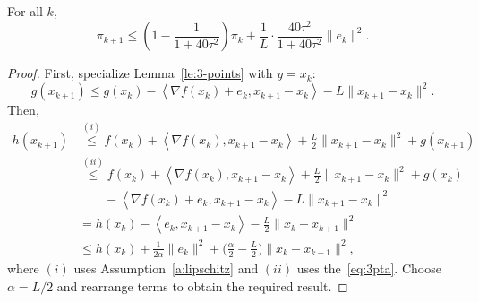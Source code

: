 \begin{lem} 
\label{lem:sufficient_decrease} For all $k$, 
\[
\pi_{k+1}\leq\left(1-\frac{1}{1+40\tau^{2}}\right)\pi_{k}
   +\frac{1}{L}\cdot\frac{40\tau^{2}}{1+40\tau^{2}}\|e_{k}\|^{2}.
\]
\end{lem}

\begin{proof} First, specialize Lemma~\ref{le:3-points} with $y=x_{k}$:
\begin{equation} \label{eq:3pta}
g(x_{k+1}) \leq g(x_{k})-\left\langle \nabla f(x_{k})
  +e_{k},x_{k+1}-x_{k}\right\rangle -L\|x_{k+1}-x_{k}\|^{2}.
\end{equation}
Then,
\begin{align*}
h(x_{k+1}) & \overset{(i)}{\leq}f(x_{k})+\left\langle \nabla f(x_{k}),x_{k+1}-x_{k}\right\rangle +\frac{L}{2}\|x_{k+1}-x_{k}\|^{2}+g(x_{k+1})\\
 & \overset{(ii)}{\leq}f(x_{k})+\left\langle \nabla f(x_{k}),x_{k+1}-x_{k}\right\rangle +\frac{L}{2}\|x_{k+1}-x_{k}\|^{2}+g(x_{k})\\
 &\qquad-\left\langle \nabla f(x_{k})+e_{k},x_{k+1}-x_{k}\right\rangle -L\|x_{k+1}-x_{k}\|^{2}\\
 &= h(x_{k})-\left\langle e_{k},x_{k+1}-x_{k}\right\rangle -\frac{L}{2}\|x_{k}-x_{k+1}\|^{2}\\
 &\leq h(x_{k})+\tfrac{1}{2\alpha}\|e_{k}\|^{2}+\Big(\frac{\alpha}{2}-\frac{L}{2}\Big)\|x_{k}-x_{k+1}\|^{2},
\end{align*}
where $(i)$ uses Assumption~\eqref{a:lipschitz} and $(ii)$ uses
the~\eqref{eq:3pta}. Choose $\alpha=L/2$ and rearrange terms to obtain
the required result.
\end{proof}

